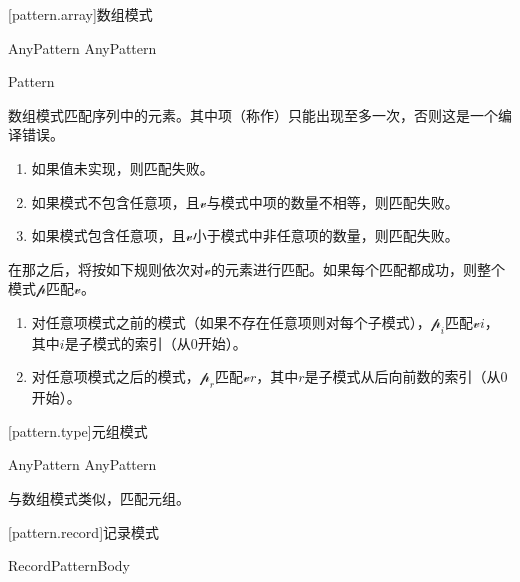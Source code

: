 [pattern.array]{数组模式}

\begin{bnf}
 \br
    \terminal{[} AnyPattern \bnflp\terminal{,} AnyPattern\bnfrp\bnfs\ \terminal{]}
\end{bnf}

\begin{bnf}
 \br
    Pattern\br
\end{bnf}

\pnum
数组模式匹配序列中的元素。其中项（称作）只能出现至多一次，否则这是一个编译错误。

\begin{enumerate}
    \item 如果值未实现，则匹配失败。
    \item 如果模式不包含任意项，且$\mathcal{v}$与模式中项的数量不相等，则匹配失败。
    \item 如果模式包含任意项，且$\mathcal{v}$小于模式中非任意项的数量，则匹配失败。
\end{enumerate}

\pnum
在那之后，将按如下规则依次对$\mathcal{v}$的元素进行匹配。如果每个匹配都成功，则整个模式$\mathcal{p}$匹配$\mathcal{v}$。

\begin{enumerate}
    \item 对任意项模式之前的模式（如果不存在任意项则对每个子模式），$\mathcal{p}_i$匹配$\mathcal{v}$\tcode{[}$i$\tcode{]}，其中$i$是子模式的索引（从0开始）。
    \item 对任意项模式之后的模式，$\mathcal{p}_r$匹配$\mathcal{v}$\tcode{[\$-}$r$\tcode{]}，其中$r$是子模式从后向前数的索引（从0开始）。
\end{enumerate}

[pattern.type]{元组模式}

\begin{bnf}
 \br
    \terminal{(} AnyPattern \bnflp\terminal{,} AnyPattern\bnfrp\bnfs\ \terminal{)}
\end{bnf}

\pnum
与数组模式类似，匹配元组。

[pattern.record]{记录模式}

\begin{bnf}
 \br
    \terminal{\{} RecordPatternBody \terminal{\}}
\end{bnf}

